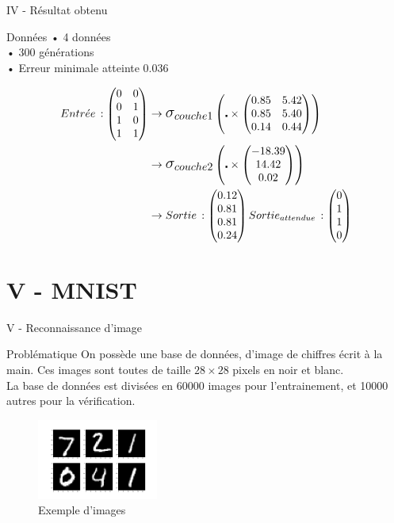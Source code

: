 \documentclass[10pt]{beamer}
\begin{document}
\begin{frame}{IV - Résultat obtenu}
\begin{block}{Données}
• 4 données \\
• 300 générations \\
• Erreur minimale atteinte 0.036
\end{block}
\begin{align*} 
Entr\acute{e} e\, :
\begin{pmatrix}
0 & 0 \\ 
0 & 1 \\ 
1 & 0 \\ 
1 & 1 
\end{pmatrix} 
		&\to  
\mathlarger{\mathlarger{\sigma_{couche1}}}
\left( \centerdot \times
\begin{pmatrix}
0.85 & 5.42 \\ 
0.85 & 5.40 \\ 
0.14 & 0.44
\end{pmatrix}
\right) \\ 
 		&\to
\mathlarger{\mathlarger{\sigma_{couche2}}}
\left( \centerdot \times
\begin{pmatrix}
-18.39\\ 
14.42 \\ 
0.02
\end{pmatrix}
\right) \\
 		&\to
Sortie\, :
\begin{pmatrix}
0.12 \\ 
0.81 \\ 
0.81 \\ 
0.24
\end{pmatrix}
Sortie_{attendue}\, :
\begin{pmatrix}
0 \\ 
1 \\ 
1 \\ 
0
\end{pmatrix}
\end{align*}
\end{frame}

\section{V - MNIST}
\begin{frame}{V - Reconnaissance d'image}
\begin{block}{Problématique}
On possède une base de données, d'image de chiffres écrit à la main. Ces images sont toutes de taille $28 \times 28$ pixels en noir et blanc. \\
La base de données est divisées en 60000 images pour l'entrainement, et 10000 autres pour la vérification.
\end{block}
\begin{figure}
	\centering
    \includegraphics[width=150px]{1-mnist.jpg}
	\caption{Exemple d'images}
\end{figure}
\end{frame}
\end{document}
